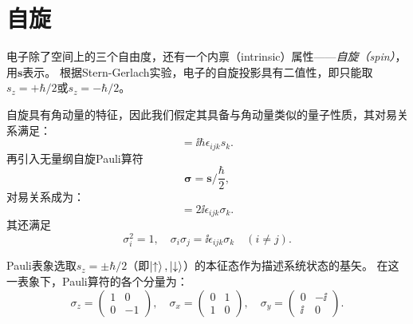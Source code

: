 \section{自旋}
\label{sec:spin}


电子除了空间上的三个自由度，还有一个内禀（intrinsic）属性——\emph{自旋（spin）}，用$\bm{s}$表示。
根据Stern-Gerlach实验，电子的自旋投影具有二值性，即只能取$s_z=+\hbar/2$或$s_z=-\hbar/2$。

自旋具有角动量的特征，因此我们假定其具备与角动量类似的量子性质，其对易关系满足：
\begin{equation}
    [s_i,s_j]=\ii\hbar\epsilon_{ijk}s_k.
\end{equation}
再引入无量纲自旋Pauli算符
\begin{equation}
    \bm{\sigma}=\bm{s}/\frac{\hbar}{2},
\end{equation}
对易关系成为：
\begin{equation}
    [\sigma_i,\sigma_j]=2\ii\epsilon_{ijk}\sigma_k.
\end{equation}
其还满足
\begin{equation}
    \sigma_i^2 = 1, \quad
    \sigma_i\sigma_j = \ii \epsilon_{ijk}\sigma_k \quad (i\ne j).
\end{equation}

Pauli表象选取$s_z=\pm\hbar/2$（即$\ket{\uparrow},\ket{\downarrow}$）的本征态作为描述系统状态的基矢。
在这一表象下，Pauli算符的各个分量为：
\begin{equation}
    \sigma_z = \begin{pmatrix}1& 0\\0&-1\end{pmatrix}, \quad
    \sigma_x = \begin{pmatrix}0& 1\\1& 0\end{pmatrix}, \quad
    \sigma_y = \begin{pmatrix}0&-\ii\\ \ii& 0\end{pmatrix}.
\end{equation}

